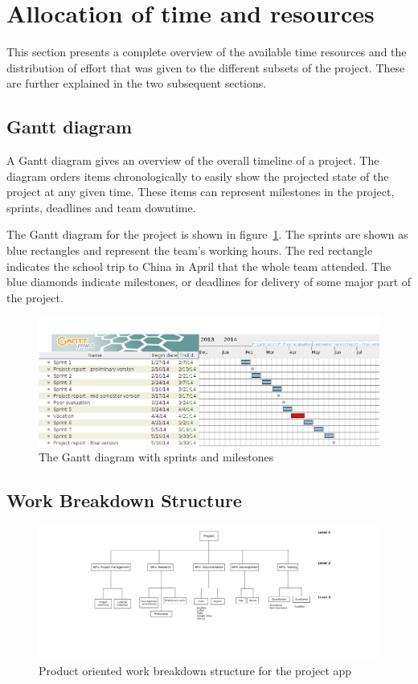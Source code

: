 \section{Allocation of time and resources}
This section presents a complete overview of the available time resources and the distribution of effort that was given to the different subsets of the project. These are further explained in the two subsequent sections.

\subsection{Gantt diagram}
\label{sec:gantt}

A Gantt diagram gives an overview of the overall timeline of a project. The diagram orders items chronologically to easily show the projected state of the project at any given time. These items can represent milestones in the project, sprints, deadlines and team downtime. 

The Gantt diagram for the project is shown in figure~\ref{fig:gantt}. The sprints are shown as blue rectangles and represent the team's working hours. The red rectangle indicates the school trip to China in April that the whole team attended. The blue diamonds indicate milestones, or deadlines for delivery of some major part of the project.


\begin{figure}[H]
\includegraphics[width=\textwidth]{ch/projectManagement/fig/gantt.png}
\caption{The Gantt diagram with sprints and milestones}
\label{fig:gantt}
\end{figure}


\subsection{Work Breakdown Structure}
\label{sec:wbs}

\begin{figure}[H]
\includegraphics[width=\textwidth, trim=9.5cm 6cm 8.5cm 0.9cm,clip]{ch/projectManagement/fig/wbs2.png}
\caption{Product oriented work breakdown structure for the project app}
\label{fig:wbs}
\end{figure}

